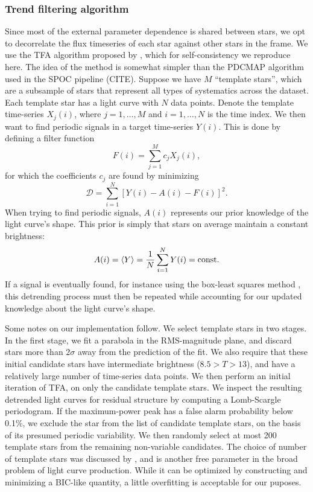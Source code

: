 \documentclass[12pt,twocolumn,tighten]{aastex62}
\begin{document}
\subsubsection{Trend filtering algorithm}
\label{sec:tfa_is_good_enough}


Since most of the external parameter dependence is shared between
stars, we opt to decorrelate the flux timeseries of each star
against other stars in the frame.
We use the TFA algorithm proposed by
\citet{kovacs_trend_2005}, which for self-consistency we reproduce
here.
The idea of the method is somewhat simpler than the PDCMAP
algorithm used in the SPOC pipeline (CITE).
Suppose we have $M$ ``template stars'', which are a subsample of
stars that represent all types of systematics across the dataset. 
Each template star has a light curve with $N$ data points.
Denote the template time-series $X_j(i)$, where $j={1,\ldots,M}$ and 
$i={1,\ldots,N}$ is the time index.
We then want to find periodic signals in a target time-series $Y(i)$.
This is done by defining a filter function
\begin{equation}
F(i) = \sum_{j=1}^{M} c_j X_j(i),
\end{equation}
for which the coefficients $c_j$ are found by minimizing
\begin{equation}
\mathcal{D} = \sum_{i=1}^{N} \left[ Y(i) - A(i) - F(i) \right]^2.
\label{eq:tfa_to_minimize}
\end{equation}
When trying to find periodic signals, $A(i)$ represents our prior
knowledge of the light curve's shape.
This prior is simply that stars on average maintain a constant brightness:
\begin{equation}
A(i) = \langle Y \rangle = \frac{1}{N} \sum_{i=1}^{N} Y(i) = {\rm const.}
\end{equation}
If a signal is eventually found, for instance using the box-least squares
method \citep{kovacs_box-fitting_2002},
this detrending process must then be repeated while accounting for our
updated knowledge about the light curve's shape.

Some notes on our implementation follow.
We select template stars in two stages.
In the first stage, we fit a parabola in the RMS-magnitude
plane, and discard stars more than $2\sigma$ away from the
prediction of the fit.
We also require that these initial candidate stars have intermediate
brightness ($8.5 > T > 13$), and have a relatively large number
of time-series data points.
We then perform an initial iteration of TFA, on only the candidate
template stars.
We inspect the resulting detrended light curves for residual
structure by computing a Lomb-Scargle periodogram.
If the maximum-power peak has a false alarm probability below 0.1\%, 
we exclude the star from the list of candidate template stars, on the
basis of its presumed periodic variability.
We then randomly select at most 200 template stars from the remaining
non-variable candidates. 
The choice of number of template stars was discussed by
\citet{Kovacs_et_al_2005}, and is another free parameter in
the broad problem of light curve production.
While it can be optimized by constructing and minimizing a BIC-like 
quantity, a little overfitting is acceptable for our puposes.
\end{document}
